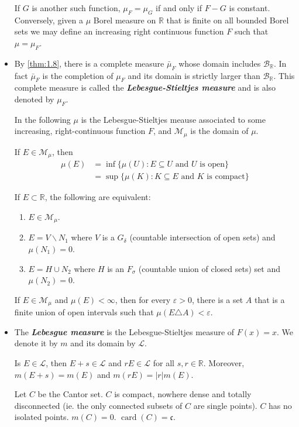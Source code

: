 \documentclass{article}
\theoremstyle{definition}
\numberwithin{equation}{section}
\newcommand{\R}{\mathbb{R}}
\begin{document}
\begin{itemize}
\begin{thm}
			If $G$ is another such function, $\mu_F=\mu_G$ if and only if $F-G$ is constant. Conversely, given a $\mu$ Borel measure on $\R$ that is finite on all bounded Borel sets we may define an increasing right continuous function $F$ such that $\mu=\mu_F$.
		\end{thm}
		\item By \cref{thm:1.8}, there is a complete measure $\bar{\mu}_F$ whose domain includes $\mathcal{B}_\R$. In fact $\bar{\mu}_F$ is the completion of $\mu_F$ and its domain is strictly larger than $\mathcal{B}_\R$. This complete measure is called the \textbf{\textit{Lebesgue-Stieltjes measure}} and is also denoted by $\mu_F$.
		
		In the following $\mu$ is the Lebesgue-Stieltjes meause associated to some increasing, right-continuous function $F$, and $\mathcal{M}_\mu$ is the domain of $\mu$. 
		\begin{thm}
			If $E\in\mathcal{M}_\mu$, then
			\begin{align*}
				\mu(E)&=\inf\{\mu(U):E\subseteq U \text{ and }U \text{ is open}\}\\
				&=\sup\{\mu(K):K\subseteq E \text{ and }K \text{ is compact}\}
			\end{align*}
		\end{thm}
		\begin{thm}
			If $E\subset \R$, the following are equivalent:
			\begin{enumerate}
				\item $E\in\mathcal{M}_\mu$.
				\item $E=V\backslash N_1$ where $V$ is a $G_\delta$ (countable intersection of open sets) and $\mu(N_1)=0$.
				\item $E=H\cup N_2$ where $H$ is an $F_\sigma$ (countable union of closed sets) set and $\mu(N_2)=0$.
			\end{enumerate}
		\end{thm}
		\begin{prop}
			If $E\in\mathcal{M}_\mu$ and $\mu(E)<\infty$, then for every $\varepsilon>0$, there is a set $A$ that is a finite union of open intervals such that $\mu(E\triangle A)<\varepsilon$.
		\end{prop}
		\item The \textbf{\textit{Lebesgue measure}} is the Lebesgue-Stieltjes measure of $F(x)=x$. We denote it by $m$ and its domain by $\mathcal{L}$.
		\begin{thm}
			Is $E\in\mathcal{L}$, then $E+s\in\mathcal{L}$ and $rE\in\mathcal{L}$ for all $s,r\in\R$. Moreover, $m(E+s)=m(E)$ and $m(rE)=|r|m(E)$.
		\end{thm}
		\begin{prop}
			Let $C$ be the Cantor set. $C$ is compact, nowhere dense and totally disconnected (ie. the only connected subsets of $C$ are single points). $C$ has no isolated points. $m(C)=0$. $\operatorname{card}(C)=\mathfrak{c}$.
		\end{prop}
		\end{itemize}
\end{document}
